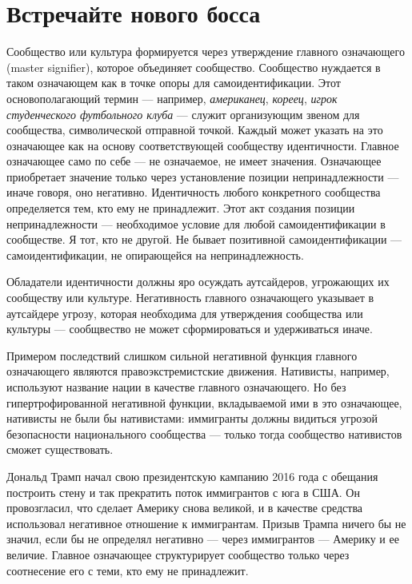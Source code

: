 \documentclass[12pt]{book}
\begin{document}
\section{Встречайте нового босса}

Сообщество или культура формируется через утверждение главного означающего (master signifier), которое объединяет сообщество. Сообщество нуждается в таком означающем как в точке опоры для самоидентификации. Этот основополагающий термин --- например, \textit{американец}, \textit{кореец}, \textit{игрок студенческого футбольного клуба} --- служит организующим звеном для сообщества, символической отправной точкой. Каждый может указать на это означающее как на основу соответствующей сообществу идентичности. Главное означающее само по себе --- не означаемое, не имеет значения. Означающее приобретает значение только через установление позиции непринадлежности --- иначе говоря, оно негативно. Идентичность любого конкретного сообщества определяется тем, кто ему не принадлежит. Этот акт создания позиции непринадлежности --- необходимое условие для любой самоидентификации в сообществе. Я тот, кто не другой. Не бывает позитивной самоидентификации --- самоидентификации, не опирающейся на непринадлежность.

Обладатели идентичности должны яро осуждать аутсайдеров, угрожающих их сообществу или культуре. Негативность главного означающего указывает в аутсайдере угрозу, которая необходима для утверждения сообщества или культуры --- сообщвество не может сформироваться и удерживаться иначе.

Примером последствий слишком сильной негативной функция главного означающего являются правоэкстремистские движения. Нативисты, например, используют название нации в качестве главного означающего. Но без гипертрофированной негативной функции, вкладываемой ими в это означающее, нативисты не были бы нативистами: иммигранты должны видиться угрозой безопасности национального сообщества --- только тогда сообщество нативистов сможет существовать.

Дональд Трамп начал свою президентскую кампанию 2016 года с обещания построить стену и так прекратить поток иммигрантов с юга в США. Он провозгласил, что сделает Америку снова великой, и в качестве средства использовал негативное отношение к иммигрантам. Призыв Трампа ничего бы не значил, если бы не определял негативно --- через иммигрантов --- Америку и ее величие. Главное означающее структурирует сообщество только через соотнесение его с теми, кто ему не принадлежит.
\end{document}
